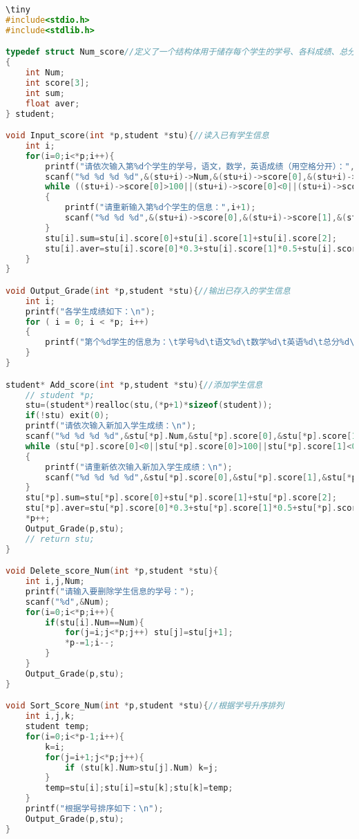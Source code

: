 \documentclass{ctexart}
\begin{document}
\begin{lstlisting}[language={c}]
\tiny
#include<stdio.h>
#include<stdlib.h>

typedef struct Num_score//定义了一个结构体用于储存每个学生的学号、各科成绩、总分、加权平均分，并取了一个别名student
{
	int Num;
	int score[3];
	int sum;
	float aver;
} student;

void Input_score(int *p,student *stu){//读入已有学生信息
	int i;
	for(i=0;i<*p;i++){
		printf("请依次输入第%d个学生的学号，语文，数学，英语成绩（用空格分开）：",i+1);
		scanf("%d %d %d %d",&(stu+i)->Num,&(stu+i)->score[0],&(stu+i)->score[1],&(stu+i)->score[2]);
		while ((stu+i)->score[0]>100||(stu+i)->score[0]<0||(stu+i)->score[1]>100||(stu+i)->score[1]<0||(stu+i)->score[2]>100||(stu+i)->score[2]<0)
		{
			printf("请重新输入第%d个学生的信息：",i+1);
			scanf("%d %d %d",&(stu+i)->score[0],&(stu+i)->score[1],&(stu+i)->score[2]);
		}
		stu[i].sum=stu[i].score[0]+stu[i].score[1]+stu[i].score[2];
		stu[i].aver=stu[i].score[0]*0.3+stu[i].score[1]*0.5+stu[i].score[2]*0.2;
	}
}

void Output_Grade(int *p,student *stu){//输出已存入的学生信息
	int i;
	printf("各学生成绩如下：\n");
	for ( i = 0; i < *p; i++)
	{
		printf("第个%d学生的信息为：\t学号%d\t语文%d\t数学%d\t英语%d\t总分%d\t加权平均分%.2f\t\n",i+1,stu[i].Num,stu[i].score[0],stu[i].score[1],stu[i].score[2],stu[i].sum,stu[i].aver);
	}
}

student* Add_score(int *p,student *stu){//添加学生信息
	// student *p;
	stu=(student*)realloc(stu,(*p+1)*sizeof(student));
	if(!stu) exit(0);
	printf("请依次输入新加入学生成绩：\n");
	scanf("%d %d %d %d",&stu[*p].Num,&stu[*p].score[0],&stu[*p].score[1],&stu[*p].score[2]);
	while (stu[*p].score[0]<0||stu[*p].score[0]>100||stu[*p].score[1]<0||stu[*p].score[1]>100||stu[*p].score[2]<0||stu[*p].score[2]>100)
	{
		printf("请重新依次输入新加入学生成绩：\n");
		scanf("%d %d %d %d",&stu[*p].score[0],&stu[*p].score[1],&stu[*p].score[2]);
	}
	stu[*p].sum=stu[*p].score[0]+stu[*p].score[1]+stu[*p].score[2];
	stu[*p].aver=stu[*p].score[0]*0.3+stu[*p].score[1]*0.5+stu[*p].score[2]*0.2;
	*p++;
	Output_Grade(p,stu);
	// return stu;
}

void Delete_score_Num(int *p,student *stu){
	int i,j,Num;
	printf("请输入要删除学生信息的学号：");
	scanf("%d",&Num);
	for(i=0;i<*p;i++){
		if(stu[i].Num==Num){
			for(j=i;j<*p;j++) stu[j]=stu[j+1];
			*p-=1;i--;
		}
	}
	Output_Grade(p,stu);
}

void Sort_Score_Num(int *p,student *stu){//根据学号升序排列
	int i,j,k;
	student temp;
	for(i=0;i<*p-1;i++){
		k=i;
		for(j=i+1;j<*p;j++){
			if (stu[k].Num>stu[j].Num) k=j;
		}
		temp=stu[i];stu[i]=stu[k];stu[k]=temp;
	}
	printf("根据学号排序如下：\n");
	Output_Grade(p,stu);
}


\end{lstlisting}
\end{document}
